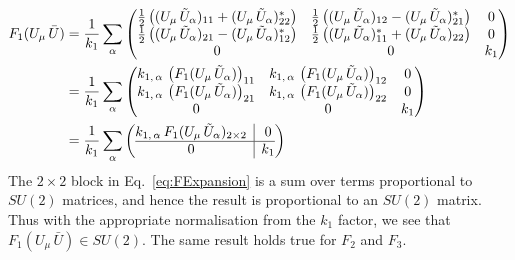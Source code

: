 %
\begin{align}
F_1(U_\mu \, \bar{U}) &= \frac{1}{k_1}\sum_\alpha
\begin{pmatrix}
\frac{1}{2}\left((U_\mu \, \tilde{U}_\alpha)_{11} + (U_\mu \, \tilde{U}_\alpha)^*_{22}\right) & \frac{1}{2}\left((U_\mu \, \tilde{U}_\alpha)_{12} - (U_\mu \, \tilde{U}_\alpha)^*_{21}\right) & 0\\
\frac{1}{2}\left((U_\mu \, \tilde{U}_\alpha)_{21} - (U_\mu \, \tilde{U}_\alpha)^*_{12}\right) & \frac{1}{2}\left((U_\mu \, \tilde{U}_\alpha)^*_{11} + (U_\mu \, \tilde{U}_\alpha)_{22}\right) & 0\\
0 & 0 & k_1
\end{pmatrix}\nonumber\\
&=\frac{1}{k_1}\sum_\alpha
\begin{pmatrix}
k_{1,\,\alpha}\,\left(F_1(U_\mu\,\tilde{U}_\alpha)\right)_{11} & k_{1,\,\alpha}\,\left(F_1(U_\mu\,\tilde{U}_\alpha)\right)_{12} & 0\\
k_{1,\,\alpha}\,\left(F_1(U_\mu\,\tilde{U}_\alpha)\right)_{21} & k_{1,\,\alpha}\,\left(F_1(U_\mu\,\tilde{U}_\alpha)\right)_{22} & 0\\
0 & 0 & k_1
\end{pmatrix}\nonumber\\
&=\frac{1}{k_1}\sum_\alpha
\left(\begin{array}{@{}c|c@{}}
k_{1,\,\alpha} \,F_1(U_\mu\,\tilde{U}_\alpha)_{2\times 2} & 0\\
  \hline 
0 & k_1
\end{array}\right)
\label{eq:FExpansion}
\end{align}
%
The $2\times 2$ block in Eq.~\eqref{eq:FExpansion} is a sum over terms proportional to $SU(2)$ matrices, and hence the result is proportional to an $SU(2)$ matrix. Thus with the appropriate normalisation from the $k_1$ factor, we see that $F_1(U_\mu \, \bar{U})\in SU(2)$. The same result holds true for $F_2$ and $F_3$.\\


